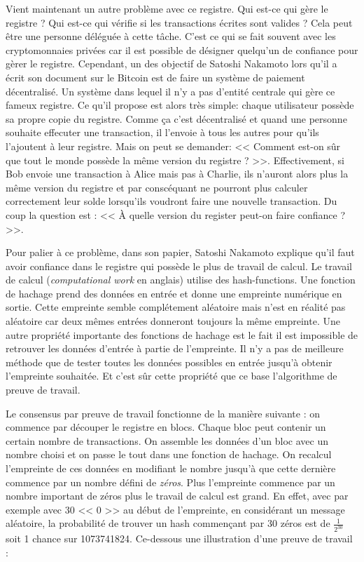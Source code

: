 Vient maintenant un autre problème avec ce registre. Qui est-ce qui gère le registre ? Qui est-ce qui vérifie si les transactions écrites sont valides ? Cela peut être une personne déléguée à cette tâche. C'est ce qui se fait souvent avec les cryptomonnaies privées car il est possible de désigner quelqu'un de confiance pour gèrer le registre. Cependant, un des objectif de Satoshi Nakamoto lors qu'il a écrit son document sur le Bitcoin est de faire un système de paiement décentralisé. Un système dans lequel il n'y a pas d'entité centrale qui gère ce fameux registre. Ce qu'il propose est alors très simple: chaque utilisateur possède sa propre copie du registre. Comme ça c'est décentralisé et quand une personne souhaite effecuter une transaction, il l'envoie à tous les autres pour qu'ils l'ajoutent à leur registre. Mais on peut se demander: << Comment est-on sûr que tout le monde possède la même version du registre ? >>. Effectivement, si Bob envoie une transaction à Alice mais pas à Charlie, ils n'auront alors plus la même version du registre et par conscéquant ne pourront plus calculer correctement leur solde lorsqu'ils voudront faire une nouvelle transaction. Du coup la question est : << À quelle version du register peut-on faire confiance ? >>.

Pour palier à ce problème, dans son papier, Satoshi Nakamoto explique qu'il faut avoir confiance dans le registre qui possède le plus de travail de calcul. Le travail de calcul (\emph{computational work} en anglais) utilise des \glspl{hash-function}. Une fonction de hachage prend des données en entrée et donne une empreinte numérique en sortie. Cette empreinte semble complétement aléatoire mais n'est en réalité pas aléatoire car deux mêmes entrées donneront toujours la même empreinte. Une autre propriété importante des fonctions de hachage est le fait il est impossible de retrouver les données d'entrée à partie de l'empreinte. Il n'y a pas de meilleure méthode que de tester toutes les données possibles en entrée jusqu'à obtenir l'empreinte souhaitée. Et c'est sûr cette propriété que ce base l'algorithme de preuve de travail.

Le consensus par preuve de travail fonctionne de la manière suivante : on commence par découper le registre en blocs. Chaque bloc peut contenir un certain nombre de transactions. On assemble les données d'un bloc avec un nombre choisi et on passe le tout dans une fonction de hachage. On recalcul l'empreinte de ces données en modifiant le nombre jusqu'à que cette dernière commence par un nombre défini de \emph{zéros}. Plus l'empreinte commence par un nombre important de zéros plus le travail de calcul est grand. En effet, avec par exemple avec 30 << 0 >> au début de l'empreinte, en considérant un message aléatoire, la probabilité de trouver un hash commençant par 30 zéros est de $\frac{1}{2^{30}}$ soit 1 chance sur 1073741824. Ce-dessous une illustration d'une preuve de travail :

